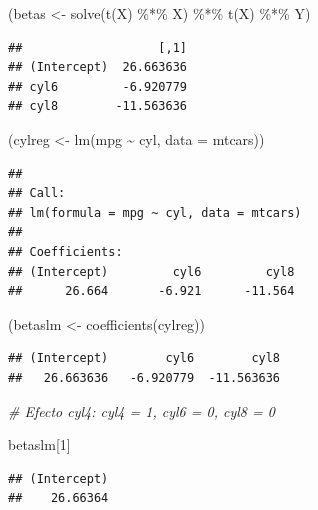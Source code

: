 \documentclass[
  12pt,
]{book}
\newenvironment{Shaded}{\begin{snugshade}}{\end{snugshade}}
\newcommand{\AttributeTok}[1]{\textcolor[rgb]{0.77,0.63,0.00}{#1}}
\newcommand{\CommentTok}[1]{\textcolor[rgb]{0.56,0.35,0.01}{\textit{#1}}}
\newcommand{\DecValTok}[1]{\textcolor[rgb]{0.00,0.00,0.81}{#1}}
\newcommand{\FunctionTok}[1]{\textcolor[rgb]{0.00,0.00,0.00}{#1}}
\newcommand{\NormalTok}[1]{#1}
\newcommand{\OtherTok}[1]{\textcolor[rgb]{0.56,0.35,0.01}{#1}}
\newcommand{\SpecialCharTok}[1]{\textcolor[rgb]{0.00,0.00,0.00}{#1}}
\theoremstyle{definition}
\theoremstyle{definition}
\theoremstyle{definition}
\theoremstyle{definition}
\theoremstyle{remark}
\begin{document}
\begin{Shaded}
\begin{Highlighting}[]
\NormalTok{(betas }\OtherTok{\textless{}{-}} \FunctionTok{solve}\NormalTok{(}\FunctionTok{t}\NormalTok{(X) }\SpecialCharTok{\%*\%}\NormalTok{ X) }\SpecialCharTok{\%*\%} \FunctionTok{t}\NormalTok{(X) }\SpecialCharTok{\%*\%}\NormalTok{ Y)}
\end{Highlighting}
\end{Shaded}

\begin{verbatim}
##                   [,1]
## (Intercept)  26.663636
## cyl6         -6.920779
## cyl8        -11.563636
\end{verbatim}

\begin{Shaded}
\begin{Highlighting}[]
\NormalTok{(cylreg }\OtherTok{\textless{}{-}} \FunctionTok{lm}\NormalTok{(mpg }\SpecialCharTok{\textasciitilde{}}\NormalTok{ cyl, }\AttributeTok{data =}\NormalTok{ mtcars))}
\end{Highlighting}
\end{Shaded}

\begin{verbatim}
## 
## Call:
## lm(formula = mpg ~ cyl, data = mtcars)
## 
## Coefficients:
## (Intercept)         cyl6         cyl8  
##      26.664       -6.921      -11.564
\end{verbatim}

\begin{Shaded}
\begin{Highlighting}[]
\NormalTok{(betaslm }\OtherTok{\textless{}{-}} \FunctionTok{coefficients}\NormalTok{(cylreg))}
\end{Highlighting}
\end{Shaded}

\begin{verbatim}
## (Intercept)        cyl6        cyl8 
##   26.663636   -6.920779  -11.563636
\end{verbatim}

\begin{Shaded}
\begin{Highlighting}[]
\CommentTok{\# Efecto cyl4: cyl4 = 1, cyl6 = 0, cyl8 = 0}

\NormalTok{betaslm[}\DecValTok{1}\NormalTok{]}
\end{Highlighting}
\end{Shaded}

\begin{verbatim}
## (Intercept) 
##    26.66364
\end{verbatim}
\end{document}
